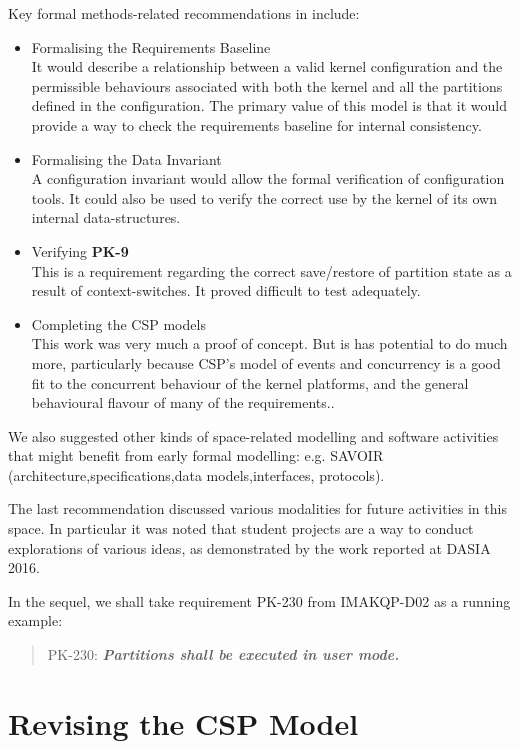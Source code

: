Key formal methods-related recommendations in \cite{FMEIMAKQP-R1} include:
\begin{itemize}
  \item
    Formalising the Requirements Baseline\\
    It would describe a relationship between a valid kernel configuration
    and the permissible behaviours associated
    with both the kernel and all the partitions defined in the configuration.
    The primary value of this model
    is that it would provide a way to check the requirements
    baseline for internal consistency.
  \item
    Formalising the Data Invariant\\
    A configuration invariant would allow the formal verification
    of configuration tools.
    It could also be used to verify the correct use by the kernel of its
    own internal data-structures.
  \item
    Verifying \textbf{PK-9}\\
    This is a requirement regarding the correct save/restore of partition state
    as a result of context-switches.
    It proved difficult to test adequately.
  \item
    Completing the CSP models\\
    This work \cite{KH-MCS2016} was very much a proof of concept.
    But is has potential to do much more,
    particularly because CSP's model of events and concurrency
    is a good fit to the concurrent behaviour of the kernel platforms,
    and the general behavioural flavour of many of the requirements..
\end{itemize}
We also suggested other kinds of space-related modelling and software
activities that might benefit from early formal modelling:
e.g. SAVOIR (architecture,specifications,data models,interfaces, protocols).

The last recommendation discussed various modalities
for future activities in this space.
In particular it was noted that student projects
are a way to conduct explorations of various ideas,
as demonstrated by the work reported at DASIA 2016.

In the sequel,
we shall take requirement PK-230 from IMAKQP-D02\cite{IMAKQP-D02}
as a running example:
\begin{quote}
PK-230: \textit{\textbf{Partitions shall be executed in user mode.}}
\end{quote}

\section{Revising the CSP Model}

